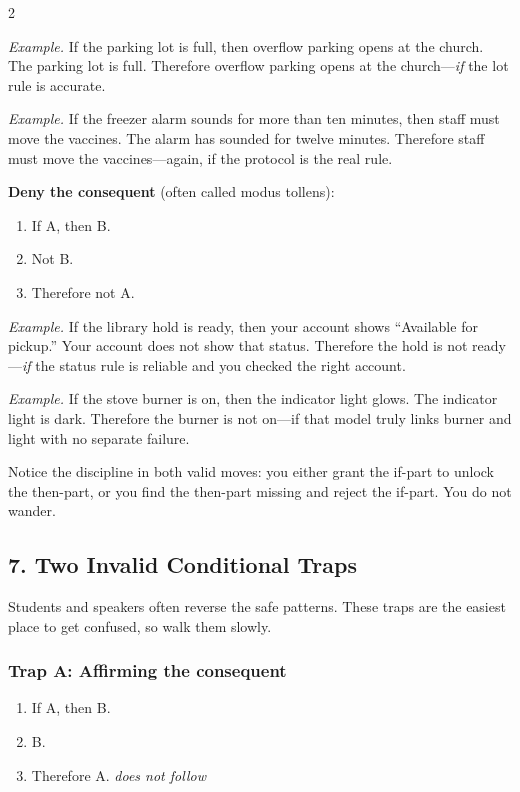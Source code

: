 \documentclass[12pt]{article}
\newcommand{\exbox}[1]{\par\vspace{0.2em}\noindent\textit{Example.} #1\par\vspace{0.15em}}
\begin{document}
\begin{multicols}{2}
\exbox{If the parking lot is full, then overflow parking opens at the church. The parking lot is full. Therefore overflow parking opens at the church---\textit{if} the lot rule is accurate.}

\exbox{If the freezer alarm sounds for more than ten minutes, then staff must move the vaccines. The alarm has sounded for twelve minutes. Therefore staff must move the vaccines---again, if the protocol is the real rule.}

\textbf{Deny the consequent} (often called modus tollens):
\begin{enumerate}[leftmargin=*,itemsep=0.08em]
\item If A, then B.
\item Not B.
\item Therefore not A.
\end{enumerate}

\exbox{If the library hold is ready, then your account shows ``Available for pickup.'' Your account does not show that status. Therefore the hold is not ready---\textit{if} the status rule is reliable and you checked the right account.}

\exbox{If the stove burner is on, then the indicator light glows. The indicator light is dark. Therefore the burner is not on---if that model truly links burner and light with no separate failure.}

Notice the discipline in both valid moves: you either grant the if-part to unlock the then-part, or you find the then-part missing and reject the if-part. You do not wander.

\subsection*{7. Two Invalid Conditional Traps}
Students and speakers often reverse the safe patterns. These traps are the easiest place to get confused, so walk them slowly.

\subsubsection*{Trap A: Affirming the consequent}
\begin{enumerate}[leftmargin=*,itemsep=0.08em]
\item If A, then B.
\item B.
\item Therefore A. \quad\textit{does not follow}
\end{enumerate}


\end{multicols}
\end{document}
